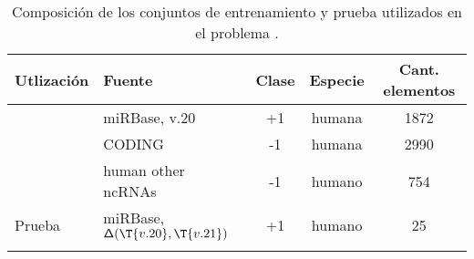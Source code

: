 \begin{table}[h]
  \tableStyle
  \begin{tabular}{llScS}
    \toprule
    Utlización & Fuente & {Clase} & Especie & {Cant. elementos} \\
    \midrule
    &  miRBase, v.20      & +1    & humana    & 1872              \\
    & CODING             & -1    & humana    & 2990              \\
    & human other ncRNAs & -1    & humano    &  754              \\
    \midrule
    {Prueba} &  miRBase, $\mathbf{\mathsf{\Delta}}(\T{v.20},\T{v.21})$
                          & +1    & humano    & 25                \\
    \bottomrule
    \\
  \end{tabular}
  \caption{\captionStyle Composición de los conjuntos de entrenamiento
    y prueba utilizados en el problema
    .}
  \label{tbl:problem-deltamirbase}

\end{table}